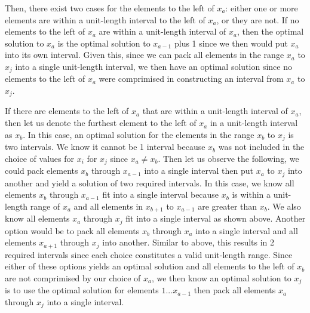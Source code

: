 \documentclass[11pt]{article}
\begin{document}
Then, there exist two cases for the elements to the left of $x_a$: either one or more elements are within a unit-length interval to the left of $x_a$, or they are not. If no elements to the left of $x_a$ are within a unit-length interval of $x_a$, then the optimal solution to $x_a$ is the optimal solution to $x_{a-1}$ plus 1 since we then would put $x_a$ into its own interval. Given this, since we can pack all elements in the range $x_a$ to $x_j$ into a single unit-length interval, we then have an optimal solution since no elements to the left of $x_a$ were comprimised in constructing an interval from $x_a$ to $x_j$.

If there are elements to the left of $x_a$ that are within a unit-length interval of $x_a$, then let us denote the furthest element to the left of $x_a$ in a unit-length interval as $x_b$. In this case, an optimal solution for the elements in the range $x_b$ to $x_j$ is two intervals. We know it cannot be 1 interval because $x_b$ was not included in the choice of values for $x_i$ for $x_j$ since $x_a \neq x_b$. Then let us observe the following, we could pack elements $x_b$ through $x_{a-1}$ into a single interval then put $x_a$ to $x_j$ into another and yield a solution of two required intervals. In this case, we know all elements $x_b$ through $x_{a-1}$ fit into a single interval because $x_b$ is within a unit-length range of $x_a$ and all elements in $x_{b+1}$ to $x_{a-1}$ are greater than $x_b$. We also know all elements $x_a$ through $x_j$ fit into a single interval as shown above. Another option would be to pack all elements $x_b$ through $x_a$ into a single interval and all elements $x_{a+1}$ through $x_j$ into another. Similar to above, this results in 2 required intervals since each choice constitutes a valid unit-length range. Since either of these options yields an optimal solution and all elements to the left of $x_b$ are not comprimised by our choice of $x_a$, we then know an optimal solution to $x_j$ is to use the optimal solution for elements $1...x_{a-1}$ then pack all elements $x_a$ through $x_j$ into a single interval.
\end{document}
